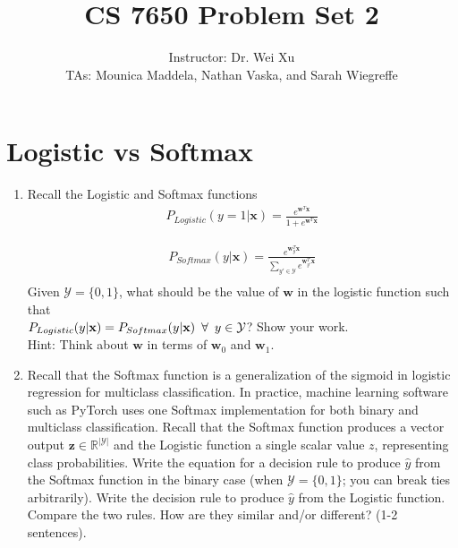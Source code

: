 \documentclass[12pt, letterpaper]{article}
\begin{document}
\title{CS 7650 Problem Set 2}
\author{Instructor: Dr. Wei Xu \\ TAs: Mounica Maddela, Nathan Vaska, and Sarah Wiegreffe}
\date{}
\maketitle

\section{Logistic vs Softmax}

\begin{enumerate}[label=\alph*.]
    \item Recall the Logistic and Softmax functions
\begin{align*}
    P_{Logistic}(y=1|\mathbf{x}) = \frac{e^{\mathbf{w}^T\mathbf{x}}}{1 + e^{\mathbf{w}^T\mathbf{x}}}
\end{align*}

\begin{align*}
    P_{Softmax}(y|\mathbf{x}) = \frac{e^{\mathbf{w}_y^T\mathbf{x}}}{\sum_{y' \in \mathcal{Y}} e^{\mathbf{w}_{y'}^T\mathbf{x}}} \\
\end{align*}
Given $\mathcal{Y} = \{0,1\}$, what should be the value of $\mathbf{w}$ in the logistic function such that \\ $P_{Logistic}(y|\textbf{x}) = P_{Softmax}(y|\textbf{x}) \hspace{0.5em} \forall \hspace{0.5em} y \in \mathcal{Y}$? Show your work. \\
Hint: Think about $\mathbf{w}$ in terms of $\mathbf{w}_0$ and $\mathbf{w}_1$.

\item Recall that the Softmax function is a generalization of the sigmoid in logistic regression for multiclass classification. In practice, machine learning software such as PyTorch uses one Softmax implementation for both binary and multiclass classification. Recall that the Softmax function produces a vector output $\mathbf{z} \in \mathbb{R}^{|\mathcal{Y}|}$ and the Logistic function a single scalar value $z$, representing class probabilities. Write the equation for a decision rule to produce $\hat{y}$ from the Softmax function in the binary case (when $\mathcal{Y} = \{0,1\}$; you can break ties arbitrarily).
Write the decision rule to produce $\hat{y}$ from the Logistic function. Compare the two rules. How are they similar and/or different? (1-2 sentences).

\end{enumerate}
\end{document}
